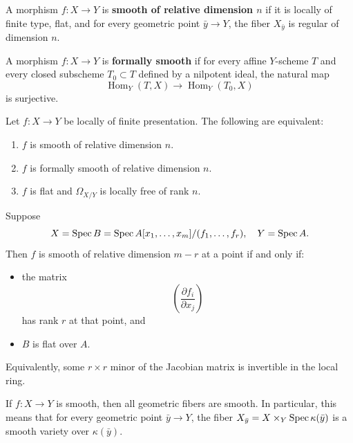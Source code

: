 \documentclass[12pt]{article}
\begin{document}
\begin{definition}
    A morphism $f:X\to Y$ is \textbf{smooth of relative dimension $n$} if it is locally of finite type, flat, and for every geometric point $\bar y \to Y$, the fiber $X_{\bar y}$ is regular of dimension $n$.
\end{definition}

\begin{definition}
    A morphism $f:X\to Y$ is \textbf{formally smooth} if for every affine $Y$-scheme $T$ and every closed subscheme $T_0 \subset T$ defined by a nilpotent ideal, the natural map
    \[
        \operatorname{Hom}_Y(T,X) \longrightarrow \operatorname{Hom}_Y(T_0,X)
    \]
    is surjective.
\end{definition}

\begin{theorem}
    Let $f:X \to Y$ be locally of finite presentation. The following are equivalent:
    \begin{enumerate}
        \item $f$ is smooth of relative dimension $n$.
        \item $f$ is formally smooth of relative dimension $n$.
        \item $f$ is flat and $\Omega_{X/Y}$ is locally free of rank $n$.
    \end{enumerate}
\end{theorem}

\begin{theorem}
    Suppose
    \[
        X = \operatorname{Spec} B = \operatorname{Spec} A[x_1,\dots,x_m]/(f_1,\dots,f_r), \quad Y = \operatorname{Spec} A.
    \]
    Then $f$ is smooth of relative dimension $m-r$ at a point if and only if:
    \begin{itemize}
        \item the matrix
              \[
                  \left(\frac{\partial f_i}{\partial x_j}\right)
              \]
              has rank $r$ at that point, and
        \item $B$ is flat over $A$.
    \end{itemize}
    Equivalently, some $r \times r$ minor of the Jacobian matrix is invertible in the local ring.
\end{theorem}

\begin{proposition}
    If $f:X \to Y$ is smooth, then all geometric fibers are smooth. In particular, this means that for every geometric point $\bar y \to Y$, the fiber $X_{\bar y} = X \times_Y \operatorname{Spec} \kappa(\bar y)$ is a smooth variety over $\kappa(\bar y)$.
\end{proposition}
\end{document}
